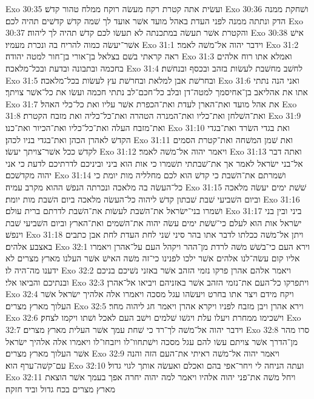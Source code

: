 Exo 30:35  ועשׂית אתה קטרת רקח מעשׂה רוקח ממלח טהור קדשׁ׃
Exo 30:36  ושׁחקת ממנה הדק ונתתה ממנה לפני העדת באהל מועד אשׁר אועד לך שׁמה קדשׁ קדשׁים תהיה לכם׃
Exo 30:37  והקטרת אשׁר תעשׂה במתכנתה לא תעשׂו לכם קדשׁ תהיה לך ליהוה׃
Exo 30:38  אישׁ אשׁר־יעשׂה כמוה להריח בה ונכרת מעמיו׃
Exo 31:1  וידבר יהוה אל־משׁה לאמר׃
Exo 31:2  ראה קראתי בשׁם בצלאל בן־אורי בן־חור למטה יהודה׃
Exo 31:3  ואמלא אתו רוח אלהים בחכמה ובתבונה ובדעת ובכל־מלאכה׃
Exo 31:4  לחשׁב מחשׁבת לעשׂות בזהב ובכסף ובנחשׁת׃
Exo 31:5  ובחרשׁת אבן למלאת ובחרשׁת עץ לעשׂות בכל־מלאכה׃
Exo 31:6  ואני הנה נתתי אתו את אהליאב בן־אחיסמך למטה־דן ובלב כל־חכם־לב נתתי חכמה ועשׂו את כל־אשׁר צויתך׃
Exo 31:7  את אהל מועד ואת־הארן לעדת ואת־הכפרת אשׁר עליו ואת כל־כלי האהל׃
Exo 31:8  ואת־השׁלחן ואת־כליו ואת־המנרה הטהרה ואת־כל־כליה ואת מזבח הקטרת׃
Exo 31:9  ואת־מזבח העלה ואת־כל־כליו ואת־הכיור ואת־כנו׃
Exo 31:10  ואת בגדי השׂרד ואת־בגדי הקדשׁ לאהרן הכהן ואת־בגדי בניו לכהן׃
Exo 31:11  ואת שׁמן המשׁחה ואת־קטרת הסמים לקדשׁ ככל אשׁר־צויתך יעשׂו׃
Exo 31:12  ויאמר יהוה אל־משׁה לאמר׃
Exo 31:13  ואתה דבר אל־בני ישׂראל לאמר אך את־שׁבתתי תשׁמרו כי אות הוא ביני וביניכם לדרתיכם לדעת כי אני יהוה מקדשׁכם׃
Exo 31:14  ושׁמרתם את־השׁבת כי קדשׁ הוא לכם מחלליה מות יומת כי כל־העשׂה בה מלאכה ונכרתה הנפשׁ ההוא מקרב עמיה׃
Exo 31:15  שׁשׁת ימים יעשׂה מלאכה וביום השׁביעי שׁבת שׁבתון קדשׁ ליהוה כל־העשׂה מלאכה ביום השׁבת מות יומת׃
Exo 31:16  ושׁמרו בני־ישׂראל את־השׁבת לעשׂות את־השׁבת לדרתם ברית עולם׃
Exo 31:17  ביני ובין בני ישׂראל אות הוא לעלם כי־שׁשׁת ימים עשׂה יהוה את־השׁמים ואת־הארץ וביום השׁביעי שׁבת וינפשׁ׃
Exo 31:18  ויתן אל־משׁה ככלתו לדבר אתו בהר סיני שׁני לחת העדת לחת אבן כתבים באצבע אלהים׃
Exo 32:1  וירא העם כי־בשׁשׁ משׁה לרדת מן־ההר ויקהל העם על־אהרן ויאמרו אליו קום עשׂה־לנו אלהים אשׁר ילכו לפנינו כי־זה משׁה האישׁ אשׁר העלנו מארץ מצרים לא ידענו מה־היה לו׃
Exo 32:2  ויאמר אלהם אהרן פרקו נזמי הזהב אשׁר באזני נשׁיכם בניכם ובנתיכם והביאו אלי׃
Exo 32:3  ויתפרקו כל־העם את־נזמי הזהב אשׁר באזניהם ויביאו אל־אהרן׃
Exo 32:4  ויקח מידם ויצר אתו בחרט ויעשׂהו עגל מסכה ויאמרו אלה אלהיך ישׂראל אשׁר העלוך מארץ מצרים׃
Exo 32:5  וירא אהרן ויבן מזבח לפניו ויקרא אהרן ויאמר חג ליהוה מחר׃
Exo 32:6  וישׁכימו ממחרת ויעלו עלת ויגשׁו שׁלמים וישׁב העם לאכל ושׁתו ויקמו לצחק׃
Exo 32:7  וידבר יהוה אל־משׁה לך־רד כי שׁחת עמך אשׁר העלית מארץ מצרים׃
Exo 32:8  סרו מהר מן־הדרך אשׁר צויתם עשׂו להם עגל מסכה וישׁתחוו־לו ויזבחו־לו ויאמרו אלה אלהיך ישׂראל אשׁר העלוך מארץ מצרים׃
Exo 32:9  ויאמר יהוה אל־משׁה ראיתי את־העם הזה והנה עם־קשׁה־ערף הוא׃
Exo 32:10  ועתה הניחה לי ויחר־אפי בהם ואכלם ואעשׂה אותך לגוי גדול׃
Exo 32:11  ויחל משׁה את־פני יהוה אלהיו ויאמר למה יהוה יחרה אפך בעמך אשׁר הוצאת מארץ מצרים בכח גדול וביד חזקה׃
